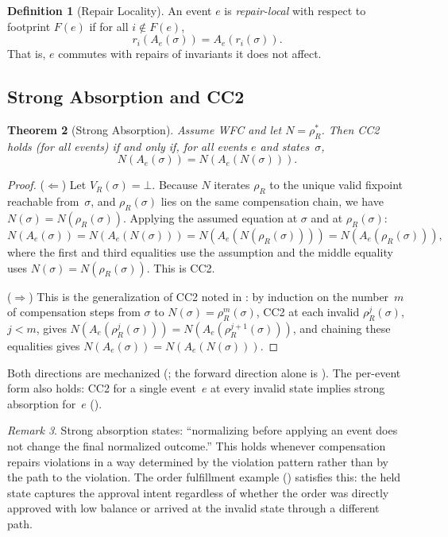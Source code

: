\documentclass[11pt,a4paper]{article}
\theoremstyle{plain}
\newtheorem{theorem}{Theorem}[section]
\theoremstyle{definition}
\newtheorem{definition}[theorem]{Definition}
\theoremstyle{remark}
\newtheorem{remark}[theorem]{Remark}
\begin{document}
\begin{definition}[Repair Locality]
\label{def:repair-locality}
An event $e$ is \emph{repair-local} with respect to footprint $F(e)$ if for
all $i \notin F(e)$,
\[
r_i(A_e(\sigma)) = A_e(r_i(\sigma)).
\]
That is, $e$ commutes with repairs of invariants it does not affect.
\end{definition}

\subsection{Strong Absorption and CC2}

\begin{theorem}[Strong Absorption]
\label{thm:strong-absorption}
Assume WFC and let $N = \rho_R^*$.  Then CC2 holds (for all events) if and
only if, for all events $e$ and states~$\sigma$,
\[
N(A_e(\sigma)) = N(A_e(N(\sigma))).
\]
\end{theorem}

\begin{proof}
($\Leftarrow$) Let $V_R(\sigma) = \bot$.  Because $N$ iterates $\rho_R$ to the
unique valid fixpoint reachable from~$\sigma$, and $\rho_R(\sigma)$ lies on the
same compensation chain, we have $N(\sigma) = N(\rho_R(\sigma))$.  Applying the
assumed equation at $\sigma$ and at $\rho_R(\sigma)$:
\[
N(A_e(\sigma)) = N(A_e(N(\sigma))) = N(A_e(N(\rho_R(\sigma)))) = N(A_e(\rho_R(\sigma))),
\]
where the first and third equalities use the assumption and the middle equality
uses $N(\sigma) = N(\rho_R(\sigma))$.  This is CC2.

($\Rightarrow$) This is the generalization of CC2 noted in
: by induction on the number~$m$ of compensation steps
from $\sigma$ to $N(\sigma) = \rho_R^m(\sigma)$, CC2 at each invalid
$\rho_R^j(\sigma)$, $j < m$, gives
$N(A_e(\rho_R^j(\sigma))) = N(A_e(\rho_R^{j+1}(\sigma)))$, and chaining these
equalities gives $N(A_e(\sigma)) = N(A_e(N(\sigma)))$.
\end{proof}

Both directions are mechanized (;
the forward direction alone is ).  The
per-event form also holds: CC2 for a single event~$e$ at every invalid state
implies strong absorption for~$e$ ().

\begin{remark}
Strong absorption states: ``normalizing before applying an event does not
change the final normalized outcome.''  This holds whenever compensation
repairs violations in a way determined by the violation pattern rather than by
the path to the violation.  The order fulfillment example
() satisfies this: the held state captures the approval
intent regardless of whether the order was directly approved with low balance
or arrived at the invalid state through a different path.
\end{remark}
\end{document}
